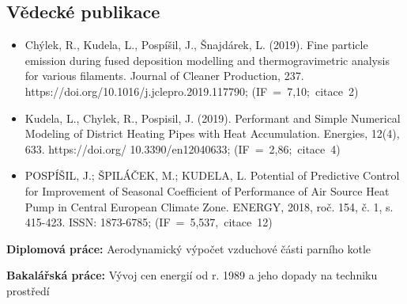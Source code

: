 \subsection*{Vědecké publikace}
\begin{itemize}[label={}, leftmargin=*]
  \item Chýlek, R., Kudela, L., Pospíšil, J., Šnajdárek, L. (2019). Fine
  particle emission during fused deposition modelling and thermogravimetric
  analysis for various filaments. Journal of Cleaner Production, 237.
  https://doi.org/10.1016/j.jclepro.2019.117790;
  \newline\mbox{(IF = 7,10; citace 2)}

  \item Kudela, L., Chylek, R., Pospisil, J. (2019). Performant and Simple
  Numerical Modeling of District Heating Pipes with Heat Accumulation. Energies,
  12(4), 633. https://doi.org/
  10.3390/en12040633; \mbox{(IF = 2,86; citace 4)}
  \newpage
  \item POSPÍŠIL, J.; ŠPILÁČEK, M.; KUDELA, L. Potential of Predictive
  Control for Improvement of Seasonal Coefficient of Performance of Air Source
  Heat Pump in Central European Climate Zone. ENERGY, 2018, roč. 154, č. 1, s. 
  415-423. ISSN: 1873-6785; \mbox{(IF = 5,537, citace 12)} 
\end{itemize}

\noindent \textbf{Diplomová práce:} Aerodynamický výpočet vzduchové části
parního kotle

\smallskip
\noindent \textbf{Bakalářská práce:} Vývoj cen energií od r. 1989 a jeho dopady
na techniku prostředí



